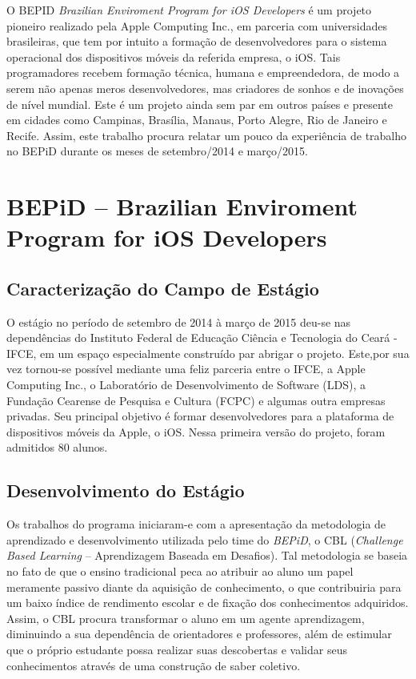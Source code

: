 \documentclass[
	12pt,				%
	openright,			%
	twoside,			%
	a4paper,			%
	english,			%
	french,				%
	spanish,			%
	brazil,				%
	]{abntex2}
\begin{document}
O BEPID \textit{Brazilian Enviroment Program for iOS Developers} é um projeto pioneiro realizado pela Apple Computing Inc., em parceria com universidades brasileiras, que tem por intuito a formação de desenvolvedores para o sistema operacional dos dispositivos móveis da referida empresa, o iOS. Tais programadores recebem formação técnica, humana e empreendedora, de modo a serem não apenas meros desenvolvedores, mas criadores de sonhos e de inovações de nível mundial. Este é um projeto ainda sem par em outros países e presente em cidades como Campinas, Brasília, Manaus, Porto Alegre, Rio de Janeiro e Recife. Assim, este trabalho procura relatar um pouco da experiência de trabalho no BEPiD durante os meses de setembro/2014 e março/2015. 



\chapter{BEPiD -- Brazilian Enviroment Program for iOS Developers}

\section{Caracterização do Campo de Estágio}

O estágio no período de setembro de 2014 à março de 2015 deu-se nas dependências do Instituto Federal de Educação Ciência e Tecnologia do Ceará - IFCE, em um espaço especialmente construído par abrigar o projeto. Este,por sua vez tornou-se possível mediante uma feliz parceria entre o IFCE, a Apple Computing Inc., o Laboratório de Desenvolvimento de Software (LDS), a Fundação Cearense de Pesquisa e Cultura (FCPC) e algumas outra empresas privadas. Seu principal objetivo é formar desenvolvedores para a plataforma de dispositivos móveis da Apple, o iOS. Nessa primeira versão do projeto, foram admitidos 80 alunos.

\section{Desenvolvimento do Estágio}
Os trabalhos do programa iniciaram-e com a apresentação da metodologia de aprendizado e desenvolvimento utilizada pelo time do \textit{BEPiD}, o CBL (\textit{Challenge Based Learning} -- Aprendizagem Baseada em Desafios). Tal metodologia se baseia no fato de que o ensino tradicional peca ao atribuir ao aluno um papel meramente passivo diante da aquisição de conhecimento, o que contribuiria para um baixo índice de rendimento escolar e de fixação dos conhecimentos adquiridos. Assim, o CBL procura transformar o aluno em um agente aprendizagem, diminuindo a sua dependência de orientadores e professores, além de estimular que o próprio estudante possa realizar suas descobertas e validar seus conhecimentos através de uma construção de saber coletivo. 
\end{document}

